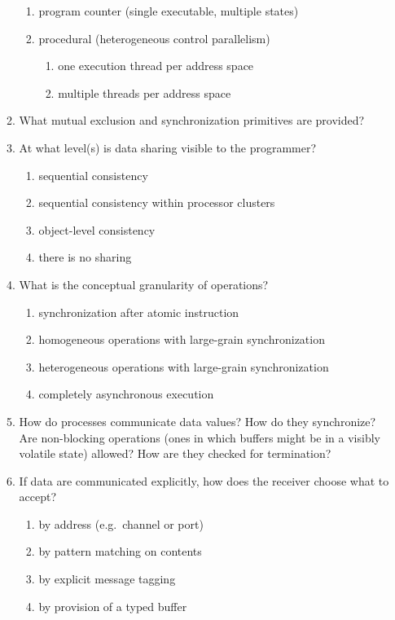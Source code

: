 \begin{enumerate}
\begin{enumerate}
\begin{enumerate}
    \item program counter (single executable, multiple states)
    \item procedural (heterogeneous control parallelism)
      \begin{enumerate}
      \item one execution thread per address space
      \item multiple threads per address space
      \end{enumerate}
    \end{enumerate}
  \item What mutual exclusion and synchronization primitives are provided?
  \item At what level(s) is data sharing visible to the programmer?
    \begin{enumerate}
    \item sequential consistency
    \item sequential consistency within processor clusters
    \item object-level consistency
    \item there is no sharing
    \end{enumerate}
  \item What is the conceptual granularity of operations?
    \begin{enumerate}
    \item synchronization after atomic instruction
    \item homogeneous operations with large-grain synchronization
    \item heterogeneous operations with large-grain synchronization
    \item completely asynchronous execution
    \end{enumerate}
  \item How do processes communicate data values?
	How do they synchronize?
	Are non-blocking operations (ones in which buffers might be
	in a visibly volatile state) allowed?
	How are they checked for termination?
  \item If data are communicated explicitly,
	how does the receiver choose what to accept?
    \begin{enumerate}
    \item by address (e.g.\ channel or port)
    \item by pattern matching on contents
    \item by explicit message tagging
    \item by provision of a typed buffer

\end{enumerate}
\end{enumerate}
\end{enumerate}
